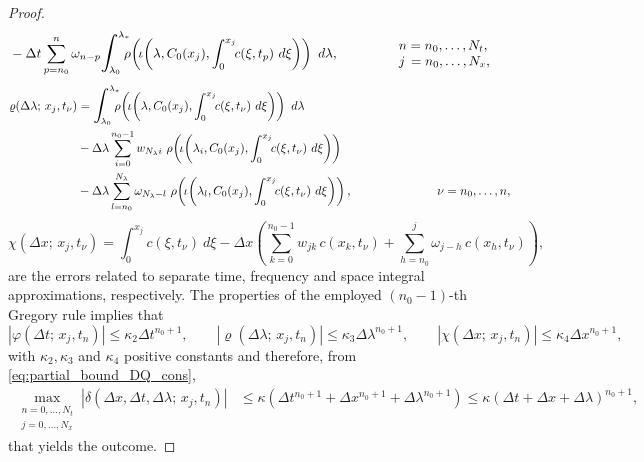 \documentclass[a4paper, UKenglish, numberwithinsect, thm-restate]{tgdk-v2021}
\begin{document}
\begin{proof}
\begin{equation*}
\begin{split}
            &- \Delta t \sum_{p=n_0}^{n} \omega_{n-p} \scalebox{1.3}{$\displaystyle\int$}_{\!\!\!\!\! \lambda_0}^{\lambda_*} \!\!\! \rho \! \left( \! \iota \! \left(\lambda, C_0(x_j) , \int_0^{x_j} \!\!   c(\xi,t_p)  \ d\xi \right) \right) \ d\lambda, 
            \qquad \qquad \begin{array}{l}
            n=n_0,\dots, N_t,  \\
            j \, =n_0,\dots, N_x, 
        \end{array}
        \end{split}
    \end{equation*}
    \begin{equation*}
        \begin{split}
            \varrho(\Delta \lambda;  \, x_j, t_{\nu})&=\scalebox{1.3}{$\displaystyle\int$}_{\!\!\!\!\! \lambda_0}^{\lambda_*} \!\!\! \rho \! \left( \! \iota \! \left(\lambda, C_0(x_j) , \int_0^{x_j} \!\!   c(\xi,t_\nu)  \ d\xi \right) \right) \ d\lambda \\
            & - \Delta \lambda  \sum_{i=0}^{n_0-1} w_{N_\lambda i} \ \rho \! \left( \! \iota \! \left(\lambda_i, C_0(x_j) , \int_0^{x_j} \!\! c(\xi,t_\nu)  \ d\xi \right) \right) \\
            & - \Delta \lambda \sum_{l=n_0}^{N_\lambda} \omega_{N_\lambda-l} \ \rho \! \left( \! \iota \! \left(\lambda_l, C_0(x_j) , \int_0^{x_j} \!\! c(\xi,t_\nu)  \ d\xi \right) \right), 
            \qquad \qquad \qquad \quad \nu=n_0,\dots,n,
        \end{split}
    \end{equation*}
    \begin{equation*}
        \chi(\Delta x;  \, x_j, t_{\nu})=\int_0^{x_j} \!\!   c(\xi,t_\nu)  \ d\xi-\Delta x \left(\sum_{k=0}^{n_0-1}w_{jk} \, c(x_k,t_\nu)+ \sum_{h=n_0}^{j}\omega_{j-h} \, c(x_h,t_\nu)\right), \phantom{\qquad  \nu=n_0,\dots,n,}
    \end{equation*}
    are the errors related to separate time, frequency and space integral approximations, respectively. The properties of the employed $(n_0-1)$-th Gregory rule implies that
    \begin{equation*}
        |\varphi (\Delta t;  \, x_j, t_n)|\leq \kappa_2 \Delta t^{n_0+1}, \qquad |\varrho (\Delta \lambda;  \, x_j, t_n)|\leq \kappa_3 \Delta \lambda^{n_0+1}, \qquad |\chi (\Delta x;  \, x_j, t_n)|\leq \kappa_4 \Delta x^{n_0+1},
    \end{equation*}
    with $\kappa_2, \kappa_3$ and $\kappa_4$ positive constants and therefore, from \eqref{eq:partial_bound_DQ_cons},
    \begin{equation*}
        \begin{split}
             \max_{\substack{n=0,\dots, N_t \\ j=0,\dots, N_x}}|\delta(\Delta x, \Delta t, \Delta \lambda; \,  x_j,t_n)|&\leq \kappa \left(\Delta t^{n_0+1}+\Delta x^{n_0+1}+\Delta \lambda^{n_0+1}\right)\leq \kappa \left(\Delta t+\Delta x+\Delta \lambda\right)^{n_0+1},
        \end{split}
    \end{equation*}
    that yields the outcome.
\end{proof}
\end{document}
